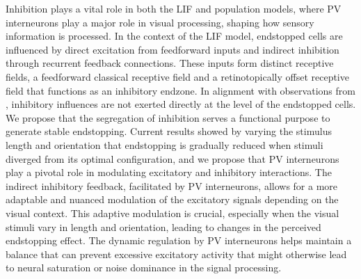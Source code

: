 \documentclass[12pt]{article}
\begin{document}

Inhibition plays a vital role in both the LIF and population models, where PV interneurons play a major role in visual processing, shaping how sensory information is processed. In the context of the LIF model, endstopped cells are influenced by direct excitation from feedforward inputs and indirect inhibition through recurrent feedback connections. These inputs form distinct receptive fields, a feedforward classical receptive field and a retinotopically offset receptive field that functions as an inhibitory endzone. In alignment with observations from \textcite{sillitoContributionExcitatoryInhibitory1977}, inhibitory influences are not exerted directly at the level of the endstopped cells. We propose that the segregation of inhibition serves a functional purpose to generate stable endstopping. Current results showed by varying the stimulus length and orientation that endstopping is gradually reduced when stimuli diverged from its optimal configuration, and we propose that PV interneurons play a pivotal role in modulating excitatory and inhibitory interactions. The indirect inhibitory feedback, facilitated by PV interneurons, allows for a more adaptable and nuanced modulation of the excitatory signals depending on the visual context. This adaptive modulation is crucial, especially when the visual stimuli vary in length and orientation, leading to changes in the perceived endstopping effect. The dynamic regulation by PV interneurons helps maintain a balance that can prevent excessive excitatory activity that might otherwise lead to neural saturation or noise dominance in the signal processing.
\end{document}
